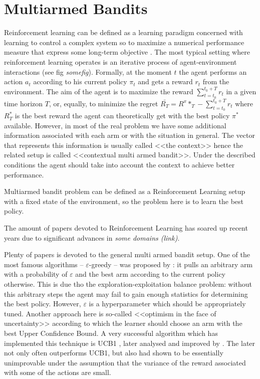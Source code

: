 
\section{Multiarmed Bandits}
Reinforcement learning can be defined as a learning paradigm concerned with learning to control a complex system so to maximize a numerical performance measure that express some long-term objective \cite{Szepesvari2010}. The most typical setting where reinforcement learning operates is an iterative process of agent-environment interactions (see fig \textit{somefig}). Formally, at the moment $t$ the agent performs an action $a_t$ according to his current policy $\pi_t$ and gets a reward $r_t$ from the environment. The aim of the agent is to maximize the reward $\sum_{t = t_0}^{t_0 + T}r_t$ in a given time horizon $T$, or, equally, to minimize the regret $\bar{R_T} = R^x*_T - \sum_{t = t_0}^{t_0 + T}r_t$ where $R^*_T$ is the best reward the agent can theoretically get with the best policy $\pi^*$ available. However, in most of the real problem we have some additional information associated with each arm or with the situation in general. The vector that represents this information is usually called <<the context>> hence the related setup is called <<contextual multi armed bandit>>. Under the described conditions the agent should take into account the context to achieve better performance. 
 
Multiarmed bandit problem can be defined as a Reinforcement Learning setup with a fixed state of the environment, so the problem here is to learn the best policy. 

The amount of papers devoted to Reinforcement Learning has soared up recent years due to significant advances in \textit{some domains (link)}.

Plenty of papers is devoted to the general multi armed bandit setup. One of the most famous algorithms -- $\varepsilon$-greedy -- was proposed by \cite{Auer2002}: it pulls an arbitrary arm with a probability of $\varepsilon$ and the best arm according to the current policy otherwise. This is due tho the exploration-exploitation balance problem: without this arbitrary steps the agent may fail to gain enough statistics for determining the best policy. However, $\varepsilon$ is a hyperparameter which should be appropriately tuned. Another approach here is so-called <<optimism in the face of uncertainty>> \cite{Lai1985} according to which the learner should choose an arm with the best Upper Confidence Bound. A very successful algorithm which has implemented this technique is UCB1 \cite{Auer2002}, later analysed and improved by \cite{Audibert2009}. The later not only often outperforms UCB1, but also had shown to be essentially unimprovable under the assumption that the variance of the reward associated with some of the actions are small.

